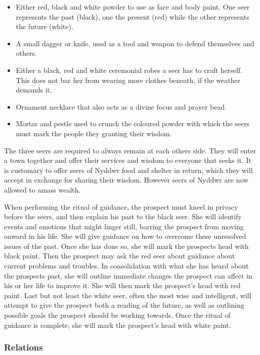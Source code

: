 \begin{itemize}[noitemsep]
  \item Either red, black and white powder to use as face and body paint. One
  seer represents the past (black), one the present (red) while the other
  represents the future (white).
  \item A small dagger or knife, used as a tool and weapon to defend themselves
  and others.
  \item Either a black, red and white ceremonial robes a seer has to craft
  herself. This does not bar her from wearing more clothes beneath, if the
  weather demands it.
  \item Ornament necklace that also acts as a divine focus and prayer bead.
  \item Mortar and pestle used to crunch the coloured powder with which the
  seers must mark the people they granting their wisdom.
\end{itemize}

The three seers are required to always remain at each others side. They will
enter a town together and offer their services and wisdom to everyone that
seeks it. It is customary to offer seers of Nyddwr food and shelter in return,
which they will accept in exchange for sharing their wisdom. However seers of
Nyddwr are now allowed to amass wealth.

When performing the ritual of guidance, the prospect must kneel in privacy
before the seers, and then explain his past to the black seer. She will
identify events and emotions that might linger still, barring the prospect
from moving onward in his life. She will give guidance on how to overcome
these unresolved issues of the past. Once she has done so, she will mark the
prospects head with black paint. Then the prospect may ask the red seer about
guidance about current problems and troubles. In consolidation with what she
has heard about the prospects past, she will outline immediate changes the
prospect can affect in his or her life to improve it. She will then mark the
prospect's head with red paint. Last but not least the white seer, often the
most wise and intelligent, will attempt to give the prospect both a reading of
the future, as well as outlining possible goals the prospect should be working
towards. Once the ritual of guidance is complete, she will mark the prospect's
head with white paint.

\subsubsection*{Relations}

